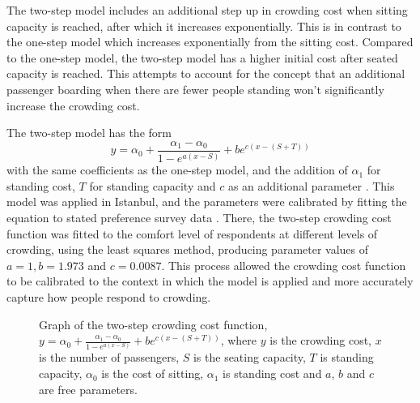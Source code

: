 \smallskip
{} 


The two-step model includes an additional step up in crowding cost when sitting capacity is reached, after which it increases exponentially. This is in contrast to the one-step model which increases exponentially from the sitting cost. Compared to the one-step model, the two-step model has a higher initial cost after seated capacity is reached. This attempts to account for the concept that an additional passenger boarding when there are fewer people standing won't significantly increase the crowding cost. 

The two-step model has the form
\begin{equation}
    \label{eqn:twostep}
    y=\alpha_0+\frac{\alpha_1-\alpha_0}{1-e^{a(x-S)}}+be^{c(x-(S+T))}
\end{equation}
with the same coefficients as the one-step model, and the addition of $\alpha_1$ for standing cost, $T$ for standing capacity and $c$ as an additional parameter \cite{depalmaDiscomfortMassTransit2015, celebiMeasuringCrowdingrelatedComfort2020}. This model was applied in Istanbul, and the parameters were calibrated by fitting the equation to stated preference survey data \cite{celebiMeasuringCrowdingrelatedComfort2020}. 
There, the two-step crowding cost function was fitted to the comfort level of respondents at different levels of crowding, using the least squares method, producing parameter values of $a=1, b=1.973$ and $c=0.0087$. This process allowed the crowding cost function to be calibrated to the context in which the model is applied and more accurately capture how people respond to crowding. 

\begin{figure}[ht]
    \centering
    \caption[Graph of two-step crowding cost function]{Graph of the two-step crowding cost function, $y=\alpha_0+\frac{\alpha_1-\alpha_0}{1-e^{a(x-S)}}+be^{c(x-(S+T))}$, where $y$ is the crowding cost, $x$ is the number of passengers, $S$ is the seating capacity, $T$ is standing capacity, $\alpha_0$ is the cost of sitting, $\alpha_1$ is standing cost and $a$, $b$ and $c$ are free parameters.}
    \label{fig:Crowding_two_step}
\end{figure}

